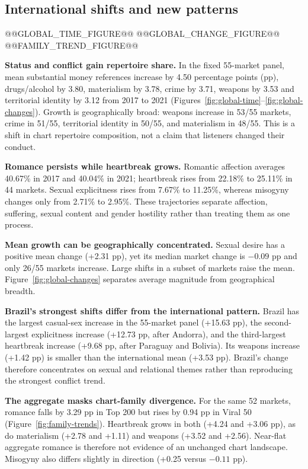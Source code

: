 \documentclass[10pt,a4paper,twocolumn]{article}
\begin{document}
\subsection{International shifts and new patterns}
@@GLOBAL_TIME_FIGURE@@
@@GLOBAL_CHANGE_FIGURE@@
@@FAMILY_TREND_FIGURE@@

\textbf{Status and conflict gain repertoire share.} In the fixed 55-market panel, mean substantial money references increase by 4.50 percentage points (pp), drugs/alcohol by 3.80, materialism by 3.78, crime by 3.71, weapons by 3.53 and territorial identity by 3.12 from 2017 to 2021 (Figures~\ref{fig:global-time}--\ref{fig:global-changes}). Growth is geographically broad: weapons increase in 53/55 markets, crime in 51/55, territorial identity in 50/55, and materialism in 48/55. This is a shift in chart repertoire composition, not a claim that listeners changed their conduct.

\textbf{Romance persists while heartbreak grows.} Romantic affection averages 40.67\% in 2017 and 40.04\% in 2021; heartbreak rises from 22.18\% to 25.11\% in 44 markets. Sexual explicitness rises from 7.67\% to 11.25\%, whereas misogyny changes only from 2.71\% to 2.95\%. These trajectories separate affection, suffering, sexual content and gender hostility rather than treating them as one process.

\textbf{Mean growth can be geographically concentrated.} Sexual desire has a positive mean change (+2.31 pp), yet its median market change is $-0.09$ pp and only 26/55 markets increase. Large shifts in a subset of markets raise the mean. Figure~\ref{fig:global-changes} separates average magnitude from geographical breadth.

\textbf{Brazil's strongest shifts differ from the international pattern.} Brazil has the largest casual-sex increase in the 55-market panel (+15.63 pp), the second-largest explicitness increase (+12.73 pp, after Andorra), and the third-largest heartbreak increase (+9.68 pp, after Paraguay and Bolivia). Its weapons increase (+1.42 pp) is smaller than the international mean (+3.53 pp). Brazil's change therefore concentrates on sexual and relational themes rather than reproducing the strongest conflict trend.

\textbf{The aggregate masks chart-family divergence.} For the same 52 markets, romance falls by 3.29 pp in Top 200 but rises by 0.94 pp in Viral 50 (Figure~\ref{fig:family-trends}). Heartbreak grows in both (+4.24 and +3.06 pp), as do materialism (+2.78 and +1.11) and weapons (+3.52 and +2.56). Near-flat aggregate romance is therefore not evidence of an unchanged chart landscape. Misogyny also differs slightly in direction (+0.25 versus $-0.11$ pp).
\end{document}
